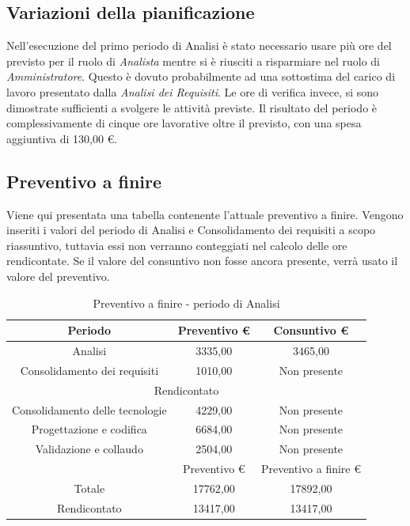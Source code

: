 \documentclass[./PianodiProgetto.tex]{subfiles}
\begin{document}
\subsection{Variazioni della pianificazione}
Nell'esecuzione del primo periodo di Analisi è stato necessario usare più
ore del previsto per il ruolo di \textit{Analista} mentre si è riusciti a risparmiare nel ruolo di \textit{Amministratore}. Questo è dovuto
probabilmente ad una sottostima del carico di lavoro presentato dalla \textit{Analisi
dei Requisiti}. Le ore di verifica invece, si sono dimostrate sufficienti a svolgere
le attività previste. Il risultato del periodo è complessivamente di cinque ore
lavorative oltre il previsto, con una spesa aggiuntiva di 130,00 \euro{}.

\subsection{Preventivo a finire}
Viene qui presentata una tabella contenente l'attuale preventivo a finire.
Vengono inseriti i valori del periodo di Analisi e Consolidamento dei requisiti a scopo riassuntivo, tuttavia essi non verranno conteggiati nel calcolo delle ore rendicontate. Se il valore del consuntivo non fosse ancora presente, verrà usato il valore del preventivo.

\begin{table}[H]
	\centering
	\begin{tabular}{|c|c|c|}
		\hline
		Periodo&Preventivo \euro{}&Consuntivo \euro{} \\ \hline
		Analisi&3335,00&3465,00  \\ \hline
		Consolidamento dei requisiti&1010,00&Non presente  \\ \hline
		\multicolumn{3}{|c|}{Rendicontato}  \\ \hline
		Consolidamento delle tecnologie&4229,00&Non presente  \\ \hline
		Progettazione e codifica&6684,00&Non presente  \\ \hline
		Validazione e collaudo&2504,00&Non presente  \\ \hline
		&Preventivo \euro{}&Preventivo a finire \euro{}  \\ \hline
		Totale&17762,00&17892,00 \\ \hline
		Rendicontato&13417,00&13417,00 \\ \hline
	\end{tabular}
	\caption{Preventivo a finire - periodo di Analisi}
\end{table}
\end{document}

